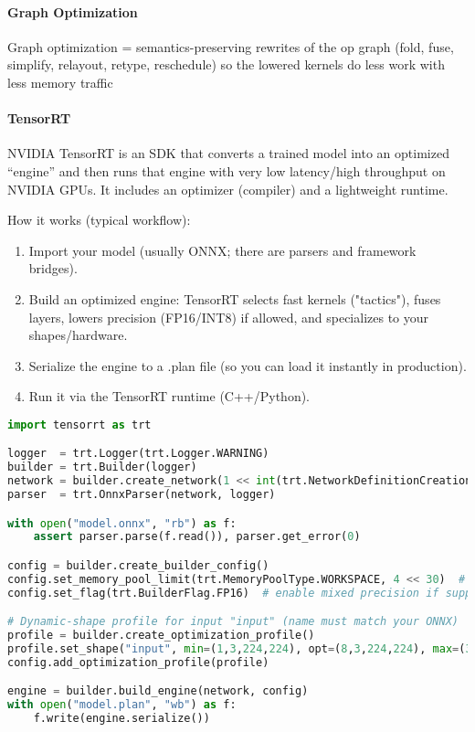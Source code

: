 \paragraph{Graph Optimization}
Graph optimization = semantics-preserving rewrites of the op graph (fold, fuse, simplify, relayout, retype, reschedule) so the lowered kernels do less work with less memory traffic

\paragraph{TensorRT} NVIDIA TensorRT is an SDK that converts a trained model into an optimized ``engine'' and then runs that engine with very low latency/high throughput on NVIDIA GPUs. It includes an optimizer (compiler) and a lightweight runtime.

How it works (typical workflow):
\begin{enumerate}
	\item Import your model (usually ONNX; there are parsers and framework bridges).
	\item Build an optimized engine: TensorRT selects fast kernels ("tactics"), fuses layers, lowers precision (FP16/INT8) if allowed, and specializes to your shapes/hardware.
	\item Serialize the engine to a .plan file (so you can load it instantly in production).
	\item Run it via the TensorRT runtime (C++/Python).
\end{enumerate}

\begin{lstlisting}[language=Python]
import tensorrt as trt

logger  = trt.Logger(trt.Logger.WARNING)
builder = trt.Builder(logger)
network = builder.create_network(1 << int(trt.NetworkDefinitionCreationFlag.EXPLICIT_BATCH))
parser  = trt.OnnxParser(network, logger)

with open("model.onnx", "rb") as f:
    assert parser.parse(f.read()), parser.get_error(0)

config = builder.create_builder_config()
config.set_memory_pool_limit(trt.MemoryPoolType.WORKSPACE, 4 << 30)  # workspace budget
config.set_flag(trt.BuilderFlag.FP16)  # enable mixed precision if supported

# Dynamic-shape profile for input "input" (name must match your ONNX)
profile = builder.create_optimization_profile()
profile.set_shape("input", min=(1,3,224,224), opt=(8,3,224,224), max=(32,3,224,224))
config.add_optimization_profile(profile)

engine = builder.build_engine(network, config)
with open("model.plan", "wb") as f:
    f.write(engine.serialize())
\end{lstlisting}




